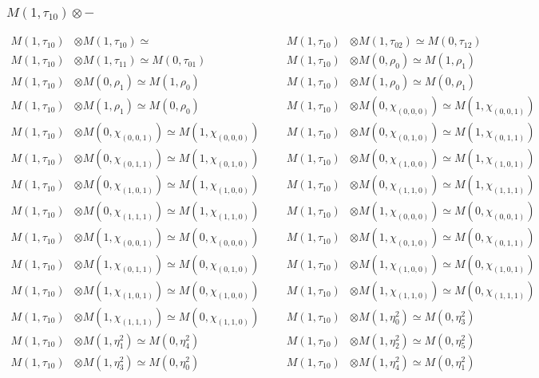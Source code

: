 \subsubsection{$ M(1,\tau_{10})\otimes -$}
\begin{align*}
M(1,\tau_{10}) &\otimes M(1,\tau_{10}) \simeq  &&& M(1,\tau_{10}) &\otimes M(1,\tau_{02}) \simeq M(0,\tau_{12})\\
M(1,\tau_{10}) &\otimes M(1,\tau_{11}) \simeq M(0,\tau_{01}) &&& M(1,\tau_{10}) &\otimes M(0,\rho_{0}) \simeq M(1,\rho_{1})\\
M(1,\tau_{10}) &\otimes M(0,\rho_{1}) \simeq M(1,\rho_{0}) &&& M(1,\tau_{10}) &\otimes M(1,\rho_{0}) \simeq M(0,\rho_{1})\\
M(1,\tau_{10}) &\otimes M(1,\rho_{1}) \simeq M(0,\rho_{0}) &&& M(1,\tau_{10}) &\otimes M(0,\chi_{(0,0,0)}) \simeq M(1,\chi_{(0,0,1)})\\
M(1,\tau_{10}) &\otimes M(0,\chi_{(0,0,1)}) \simeq M(1,\chi_{(0,0,0)}) &&& M(1,\tau_{10}) &\otimes M(0,\chi_{(0,1,0)}) \simeq M(1,\chi_{(0,1,1)})\\
M(1,\tau_{10}) &\otimes M(0,\chi_{(0,1,1)}) \simeq M(1,\chi_{(0,1,0)}) &&& M(1,\tau_{10}) &\otimes M(0,\chi_{(1,0,0)}) \simeq M(1,\chi_{(1,0,1)})\\
M(1,\tau_{10}) &\otimes M(0,\chi_{(1,0,1)}) \simeq M(1,\chi_{(1,0,0)}) &&& M(1,\tau_{10}) &\otimes M(0,\chi_{(1,1,0)}) \simeq M(1,\chi_{(1,1,1)})\\
M(1,\tau_{10}) &\otimes M(0,\chi_{(1,1,1)}) \simeq M(1,\chi_{(1,1,0)}) &&& M(1,\tau_{10}) &\otimes M(1,\chi_{(0,0,0)}) \simeq M(0,\chi_{(0,0,1)})\\
M(1,\tau_{10}) &\otimes M(1,\chi_{(0,0,1)}) \simeq M(0,\chi_{(0,0,0)}) &&& M(1,\tau_{10}) &\otimes M(1,\chi_{(0,1,0)}) \simeq M(0,\chi_{(0,1,1)})\\
M(1,\tau_{10}) &\otimes M(1,\chi_{(0,1,1)}) \simeq M(0,\chi_{(0,1,0)}) &&& M(1,\tau_{10}) &\otimes M(1,\chi_{(1,0,0)}) \simeq M(0,\chi_{(1,0,1)})\\
M(1,\tau_{10}) &\otimes M(1,\chi_{(1,0,1)}) \simeq M(0,\chi_{(1,0,0)}) &&& M(1,\tau_{10}) &\otimes M(1,\chi_{(1,1,0)}) \simeq M(0,\chi_{(1,1,1)})\\
M(1,\tau_{10}) &\otimes M(1,\chi_{(1,1,1)}) \simeq M(0,\chi_{(1,1,0)}) &&& M(1,\tau_{10}) &\otimes M(1,\eta^{2}_{0}) \simeq M(0,\eta^{2}_{3})\\
M(1,\tau_{10}) &\otimes M(1,\eta^{2}_{1}) \simeq M(0,\eta^{2}_{4}) &&& M(1,\tau_{10}) &\otimes M(1,\eta^{2}_{2}) \simeq M(0,\eta^{2}_{5})\\
M(1,\tau_{10}) &\otimes M(1,\eta^{2}_{3}) \simeq M(0,\eta^{2}_{0}) &&& M(1,\tau_{10}) &\otimes M(1,\eta^{2}_{4}) \simeq M(0,\eta^{2}_{1})\\

\end{align*}
